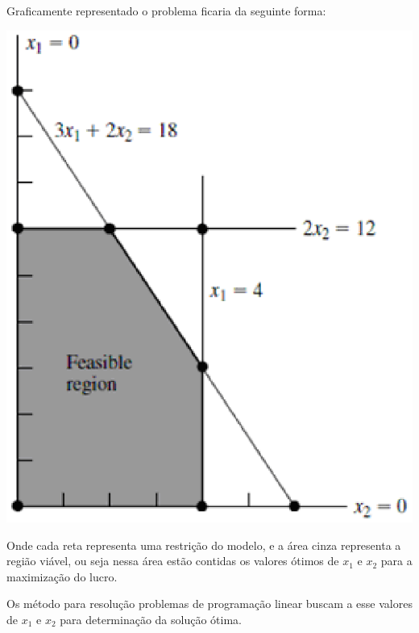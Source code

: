 Graficamente representado o problema ficaria da seguinte forma:
\begin{center}
	\includegraphics[scale=1.00]{graficos/simplex_grafico}
\end{center}

Onde cada reta representa uma restrição do modelo, e a área cinza representa a região viável, ou seja nessa área estão contidas os valores ótimos de $x_{1}$ e $x_{2}$ para a maximização do lucro.

Os método para resolução problemas de programação linear buscam a esse valores de $x_{1}$ e $x_{2}$  para determinação da solução ótima.

